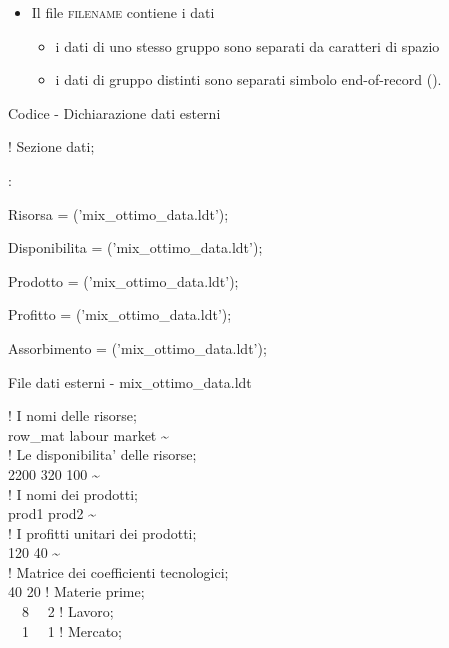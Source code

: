 \documentclass{beamer}
\newcommand{\noun}[1]{\textsc{#1}}
\def\lyxframeend{} %
\begin{document}
\begin{itemize}
\item Il file \noun{filename} contiene i dati

\begin{itemize}
\item i dati di uno stesso gruppo sono separati da caratteri di spazio
\item i dati di gruppo distinti sono separati simbolo end-of-record (\structure{\textasciitilde{}}).
\end{itemize}
\end{itemize}

\lyxframeend{}
\begin{exampleblock}
{\small Codice - Dichiarazione dati esterni}

{\small \textcolor{comment_c}{! Sezione dati;}

:

Risorsa = ('mix\_ottimo\_data.ldt');

Disponibilita = ('mix\_ottimo\_data.ldt');

Prodotto = ('mix\_ottimo\_data.ldt');

Profitto = ('mix\_ottimo\_data.ldt');

Assorbimento = ('mix\_ottimo\_data.ldt');

}

\end{exampleblock}

\lyxframeend{}
\begin{exampleblock}
{\small File dati esterni - mix\_ottimo\_data.ldt}

{\small \textcolor{comment_c}{! I nomi delle risorse;}\\
row\_mat labour market \textasciitilde{}\\
\textcolor{comment_c}{! Le disponibilita' delle risorse;}\\
2200 320 100 \textasciitilde{}\\
\textcolor{comment_c}{! I nomi dei prodotti;}\\
prod1 prod2 \textasciitilde{}\\
\textcolor{comment_c}{! I profitti unitari dei prodotti;}\\
120 40 \textasciitilde{}\\
\textcolor{comment_c}{! Matrice dei coefficienti tecnologici;}\\
40 20 \textcolor{comment_c}{! Materie prime;}\\
~~8~~ 2 \textcolor{comment_c}{! Lavoro;}\\
~~1~~ 1 \textcolor{comment_c}{! Mercato; }
}
\end{exampleblock}
\end{document}
